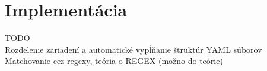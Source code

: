 \chapter{Implementácia}

TODO\\
Rozdelenie zariadení a automatické vypĺňanie štruktúr YAML súborov\\
Matchovanie cez regexy, teória o REGEX (možno do teórie)\\


